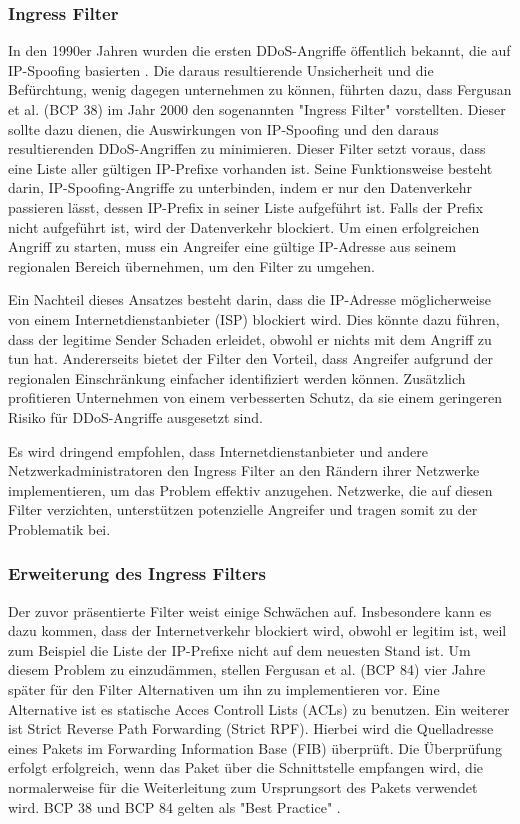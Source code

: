 \documentclass[sigplan,screen]{acmart}
\begin{document}
\subsubsection{Ingress Filter}
In den 1990er Jahren wurden die ersten DDoS-Angriffe öffentlich bekannt, die auf IP-Spoofing basierten \cite{CRP01}. Die daraus resultierende Unsicherheit und die Befürchtung, wenig dagegen unternehmen zu können, führten dazu, dass Fergusan et al. (BCP 38) \cite{Ingress01} im Jahr 2000 den sogenannten "Ingress Filter" vorstellten. Dieser sollte dazu dienen, die Auswirkungen von IP-Spoofing und den daraus resultierenden DDoS-Angriffen zu minimieren. Dieser Filter setzt voraus, dass eine Liste aller gültigen IP-Prefixe vorhanden ist. Seine Funktionsweise besteht darin, IP-Spoofing-Angriffe zu unterbinden, indem er nur den Datenverkehr passieren lässt, dessen IP-Prefix in seiner Liste aufgeführt ist. Falls der Prefix nicht aufgeführt ist, wird der Datenverkehr blockiert. Um einen erfolgreichen Angriff zu starten, muss ein Angreifer eine gültige IP-Adresse aus seinem regionalen Bereich übernehmen, um den Filter zu umgehen.

Ein Nachteil dieses Ansatzes besteht darin, dass die IP-Adresse möglicherweise von einem Internetdienstanbieter (ISP) blockiert wird. Dies könnte dazu führen, dass der legitime Sender Schaden erleidet, obwohl er nichts mit dem Angriff zu tun hat. Andererseits bietet der Filter den Vorteil, dass Angreifer aufgrund der regionalen Einschränkung einfacher identifiziert werden können. Zusätzlich profitieren Unternehmen von einem verbesserten Schutz, da sie einem geringeren Risiko für DDoS-Angriffe ausgesetzt sind.

Es wird dringend empfohlen, dass Internetdienstanbieter und andere Netzwerkadministratoren den Ingress Filter an den Rändern ihrer Netzwerke implementieren, um das Problem effektiv anzugehen. Netzwerke, die auf diesen Filter verzichten, unterstützen potenzielle Angreifer und tragen somit zu der Problematik bei.

\subsubsection{Erweiterung des Ingress Filters}
Der zuvor präsentierte Filter weist einige Schwächen auf. Insbesondere kann es dazu kommen, dass der Internetverkehr blockiert wird, obwohl er legitim ist, weil zum Beispiel die Liste der IP-Prefixe nicht auf dem neuesten Stand ist. Um diesem Problem zu einzudämmen, stellen Fergusan et al. (BCP 84) \cite{Bcp84} vier Jahre später für den Filter Alternativen um ihn zu implementieren vor. Eine Alternative ist es statische Acces Controll Lists (ACLs) zu benutzen. Ein weiterer ist Strict Reverse Path Forwarding (Strict RPF). Hierbei wird die Quelladresse eines Pakets im Forwarding Information Base (FIB) überprüft. Die Überprüfung erfolgt erfolgreich, wenn das Paket über die Schnittstelle empfangen wird, die normalerweise für die Weiterleitung zum Ursprungsort des Pakets verwendet wird. BCP 38 und BCP 84 gelten als "Best Practice" \cite{Hal01}.
\end{document}
